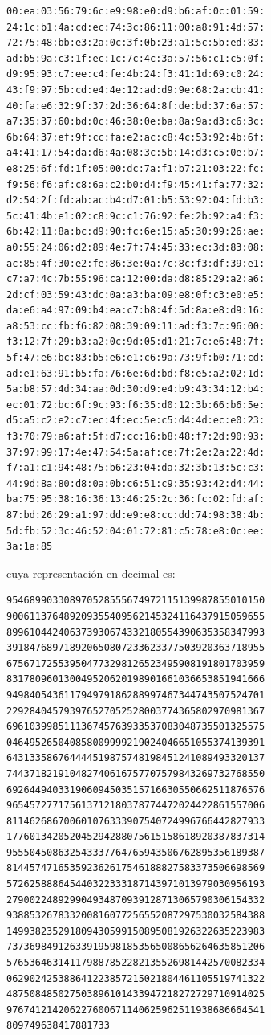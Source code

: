 \begin{verbatim}
00:ea:03:56:79:6c:e9:98:e0:d9:b6:af:0c:01:59:
24:1c:b1:4a:cd:ec:74:3c:86:11:00:a8:91:4d:57:
72:75:48:bb:e3:2a:0c:3f:0b:23:a1:5c:5b:ed:83:
ad:b5:9a:c3:1f:ec:1c:7c:4c:3a:57:56:c1:c5:0f:
d9:95:93:c7:ee:c4:fe:4b:24:f3:41:1d:69:c0:24:
43:f9:97:5b:cd:e4:4e:12:ad:d9:9e:68:2a:cb:41:
40:fa:e6:32:9f:37:2d:36:64:8f:de:bd:37:6a:57:
a7:35:37:60:bd:0c:46:38:0e:ba:8a:9a:d3:c6:3c:
6b:64:37:ef:9f:cc:fa:e2:ac:c8:4c:53:92:4b:6f:
a4:41:17:54:da:d6:4a:08:3c:5b:14:d3:c5:0e:b7:
e8:25:6f:fd:1f:05:00:dc:7a:f1:b7:21:03:22:fc:
f9:56:f6:af:c8:6a:c2:b0:d4:f9:45:41:fa:77:32:
d2:54:2f:fd:ab:ac:b4:d7:01:b5:53:92:04:fd:b3:
5c:41:4b:e1:02:c8:9c:c1:76:92:fe:2b:92:a4:f3:
6b:42:11:8a:bc:d9:90:fc:6e:15:a5:30:99:26:ae:
a0:55:24:06:d2:89:4e:7f:74:45:33:ec:3d:83:08:
ac:85:4f:30:e2:fe:86:3e:0a:7c:8c:f3:df:39:e1:
c7:a7:4c:7b:55:96:ca:12:00:da:d8:85:29:a2:a6:
2d:cf:03:59:43:dc:0a:a3:ba:09:e8:0f:c3:e0:e5:
da:e6:a4:97:09:b4:ea:c7:b8:4f:5d:8a:e8:d9:16:
a8:53:cc:fb:f6:82:08:39:09:11:ad:f3:7c:96:00:
f3:12:7f:29:b3:a2:0c:9d:05:d1:21:7c:e6:48:7f:
5f:47:e6:bc:83:b5:e6:e1:c6:9a:73:9f:b0:71:cd:
ad:e1:63:91:b5:fa:76:6e:6d:bd:f8:e5:a2:02:1d:
5a:b8:57:4d:34:aa:0d:30:d9:e4:b9:43:34:12:b4:
ec:01:72:bc:6f:9c:93:f6:35:d0:12:3b:66:b6:5e:
d5:a5:c2:e2:c7:ec:4f:ec:5e:c5:d4:4d:ec:e0:23:
f3:70:79:a6:af:5f:d7:cc:16:b8:48:f7:2d:90:93:
37:97:99:17:4e:47:54:5a:af:ce:7f:2e:2a:22:4d:
f7:a1:c1:94:48:75:b6:23:04:da:32:3b:13:5c:c3:
44:9d:8a:80:d8:0a:0b:c6:51:c9:35:93:42:d4:44:
ba:75:95:38:16:36:13:46:25:2c:36:fc:02:fd:af:
87:bd:26:29:a1:97:dd:e9:e8:cc:dd:74:98:38:4b:
5d:fb:52:3c:46:52:04:01:72:81:c5:78:e8:0c:ee:
3a:1a:85
\end{verbatim}

cuya representación en decimal es:

\begin{verbatim}
954689903308970528555674972115139987855010150
900611376489209355409562145324116437915059655
899610442406373930674332180554390635358347993
391847689718920650807233623377503920363718955
675671725539504773298126523495908191801703959
831780960130049520620198901661036653851941666
949840543611794979186288997467344743507524701
229284045793976527052528003774365802970981367
696103998511136745763933537083048735501325575
046495265040858009999219024046651055374139391
643133586764444519875748198451241089493320137
744371821910482740616757707579843269732768550
692644940331906094503515716630550662511876576
965457277175613712180378774472024422861557006
811462686700601076333907540724996766442827933
177601342052045294288075615158618920387837314
955504508632543337764765943506762895356189387
814457471653592362617546188827583373506698569
572625888645440322333187143971013979030956193
279002248929904934870939128713065790306154332
938853267833200816077256552087297530032584388
149938235291809430599150895081926322635223983
737369849126339195981853565008656264635851206
576536463141179887852282135526981442570082334
062902425388641223857215021804461105519741322
487508485027503896101433947218272729710914025
976741214206227600671140625962511938686664541
809749638417881733
\end{verbatim}

